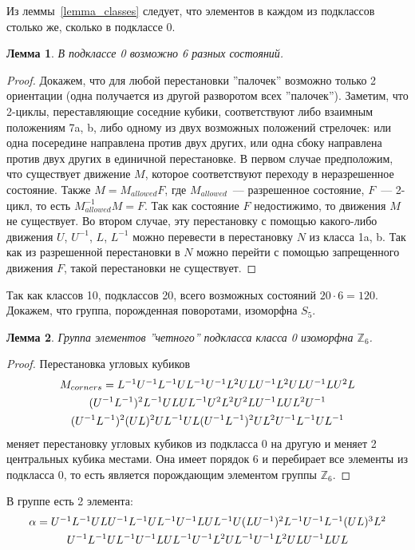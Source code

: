 \documentclass[utf8,a4paper,12pt]{article}
\newtheorem{lemma_cub}{Лемма}[section]
\begin{document}
Из леммы~\ref{lemma_classes} следует, что элементов в каждом из подклассов столько же, сколько в подклассе 0.
\begin{lemma_cub}
В подклассе 0 возможно 6 разных состояний.
\end{lemma_cub}
\begin{proof}
Докажем, что для любой перестановки ''палочек'' возможно только 2 ориентации (одна получается из другой разворотом всех ''палочек'').
Заметим, что 2-циклы, переставляющие соседние кубики, соответствуют либо взаимным положениям 7a, b, либо одному из двух возможных положений стрелочек: или одна посередине направлена против двух других, или одна сбоку направлена против двух других в единичной перестановке.
В первом случае предположим, что существует движение $M$, которое соответствуют переходу в неразрешенное состояние. Также $M=M_{allowed}F$, где $M_{allowed}$~--- разрешенное состояние, $F$~--- 2-цикл, то есть $M_{allowed}^{-1}M=F$. Так как состояние $F$ недостижимо, то движения $M$ не существует. Во втором случае, эту перестановку с помощью какого-либо движения $U$, $U^{-1}$, $L$, $L^{-1}$ можно перевести в перестановку $N$ из класса 1a, b. Так как из разрешенной перестановки в $N$ можно перейти с помощью запрещенного движения $F$, такой перестановки не существует.
\end{proof}
Так как классов 10, подклассов 20, всего возможных состояний $20\cdot 6=120$.
Докажем, что группа, порожденная поворотами, изоморфна $S_5$.
\begin{lemma_cub}
\label{lemma4}
Группа элементов ''четного'' подкласса класса 0 изоморфна $\mathbb{Z}_6$.
\end{lemma_cub}
\begin{proof}
Перестановка угловых кубиков
\begin{multline*}
$$
M_{corners}=L^{-1}U^{-1}L^{-1}UL^{-1}U^{-1}L^2ULU^{-1}L^2ULU^{-1}LU^2L \\
	(U^{-1}L^{-1})^2L^{-1}ULUL^{-1}U^2L^2U^2LU^{-1}LUL^2U^{-1} \\
		(U^{-1}L^{-1})^2(UL)^2UL^{-1}UL(U^{-1}L^{-1})^2UL^2U^{-1}L^{-1}UL^{-1}
$$
\end{multline*}
меняет перестановку угловых кубиков из подкласса 0 на другую и меняет 2 центральных кубика местами. Она имеет порядок 6 и перебирает все элементы из подкласса 0, то есть является порождающим элементом группы $\mathbb{Z}_6$.
\end{proof}
В группе есть 2 элемента:
\begin{multline*} %
$$
\alpha=U^{-1}L^{-1}ULU^{-1}L^{-1}UL^{-1}U^{-1}LUL^{-1}U(LU^{-1})^2L^{-1}U^{-1}L^{-1}(UL)^3L^2 \\
	U^{-1}L^{-1}UL^{-1}U^{-1}LUL^{-1}U^{-1}L^2UL^{-1}U^{-1}L^2ULU^{-1}LUL
$$
\end{multline*}
\end{document}
